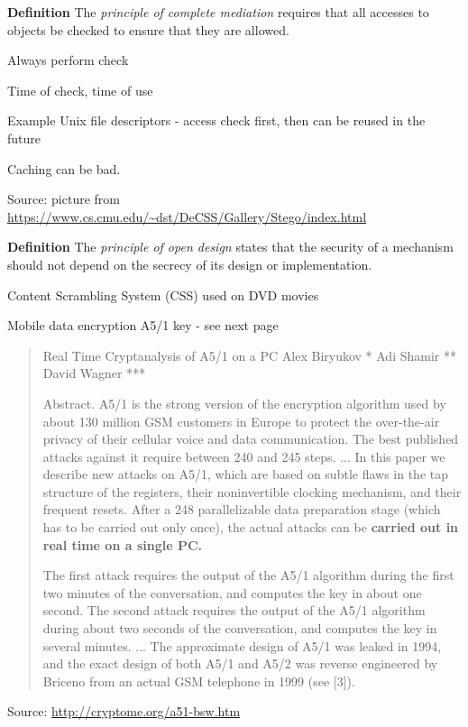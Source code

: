 \documentclass[Screen16to9,17pt]{foils}
\begin{document}

\begin{list1}
\item {\bf Definition} The \emph{principle of complete mediation} requires that all accesses to objects be checked to ensure that they are allowed.
\item Always perform check
\item Time of check, time of use
\item Example Unix file descriptors - access check first, then can be reused in the future
\item Caching can be bad.
\end{list1}




Source: picture from \url{https://www.cs.cmu.edu/~dst/DeCSS/Gallery/Stego/index.html}
\begin{list1}
\item {\bf Definition} The \emph{principle of open design} states that the security of a mechanism should not depend on the secrecy of its design or implementation.
\item Content Scrambling System (CSS) used on DVD movies
\item Mobile data encryption  A5/1 key - see next page
\end{list1}


\begin{quote}
  Real Time Cryptanalysis of A5/1 on a PC
Alex Biryukov * Adi Shamir ** David Wagner ***

  Abstract. A5/1 is the strong version of the encryption algorithm used by about 130 million GSM customers in Europe to protect the over-the-air privacy of their cellular voice and data communication. The best published attacks against it require between 240 and 245 steps. ...
  In this paper we describe new attacks on A5/1, which are based on subtle flaws in the tap structure of the registers, their noninvertible clocking mechanism, and their frequent resets. After a 248 parallelizable data preparation stage (which has to be carried out only once), the actual attacks can be {\bf carried out in real time on a single PC.}

  The first attack requires the output of the A5/1 algorithm during the first two minutes of the conversation, and computes the key in about one second. The second attack requires the output of the A5/1 algorithm during about two seconds of the conversation, and computes the key in several minutes.
  ...
  The approximate design of A5/1 was leaked in 1994, and the exact design of both A5/1 and A5/2 was reverse engineered by Briceno from an actual GSM telephone in 1999 (see [3]).
\end{quote}
Source: \url{http://cryptome.org/a51-bsw.htm}
\end{document}
